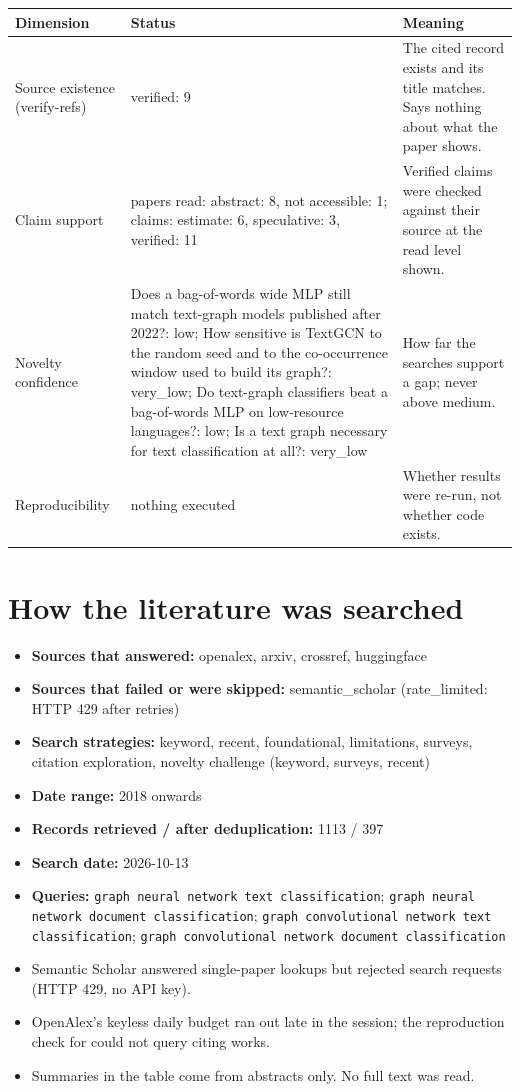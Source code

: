 \documentclass[11pt,a4paper]{article}
\begin{document}
{\small
\begin{longtable}{>{\raggedright\arraybackslash}p{}>{\raggedright\arraybackslash}p{}>{\raggedright\arraybackslash}p{}}
\toprule
\textbf{Dimension} & \textbf{Status} & \textbf{Meaning} \\
\midrule
\endhead
Source existence (verify-refs) & verified: 9 & The cited record exists and its title matches. Says nothing about what the paper shows. \\
Claim support & papers read: abstract: 8, not accessible: 1; claims: estimate: 6, speculative: 3, verified: 11 & Verified claims were checked against their source at the read level shown. \\
Novelty confidence & Does a bag-of-words wide MLP still match text-graph models published after 2022?: low; How sensitive is TextGCN to the random seed and to the co-occurrence window used to build its graph?: very\_low; Do text-graph classifiers beat a bag-of-words MLP on low-resource languages?: low; Is a text graph necessary for text classification at all?: very\_low & How far the searches support a gap; never above medium. \\
Reproducibility & nothing executed & Whether results were re-run, not whether code exists. \\
\bottomrule
\end{longtable}
}

\section{How the literature was searched}

\begin{itemize}
\item \textbf{Sources that answered:} openalex, arxiv, crossref, huggingface
\item \textbf{Sources that failed or were skipped:} semantic\_scholar (rate\_limited: HTTP 429 after retries)
\item \textbf{Search strategies:} keyword, recent, foundational, limitations, surveys, citation exploration, novelty challenge (keyword, surveys, recent)
\item \textbf{Date range:} 2018 onwards
\item \textbf{Records retrieved / after deduplication:} 1113 / 397
\item \textbf{Search date:} 2026-10-13
\item \textbf{Queries:} \texttt{graph neural network text classification}; \texttt{graph neural network document classification}; \texttt{graph convolutional network text classification}; \texttt{graph convolutional network document classification}
\item Semantic Scholar answered single-paper lookups but rejected search requests (HTTP 429, no API key).
\item OpenAlex's keyless daily budget ran out late in the session; the reproduction check for \cite{abdalla2023} could not query citing works.
\item Summaries in the table come from abstracts only. No full text was read.
\end{itemize}
\end{document}
